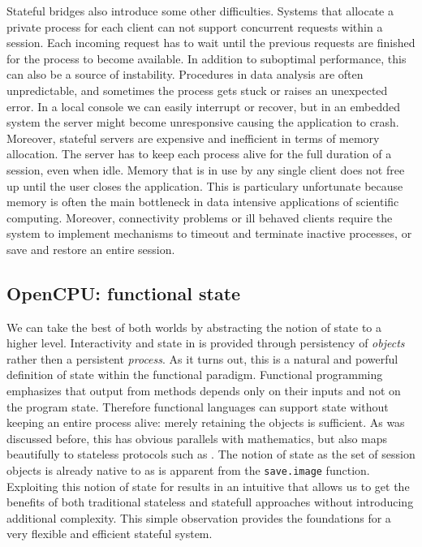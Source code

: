 Stateful bridges also introduce some other difficulties. Systems that allocate a private \R process for each client can not support concurrent requests within a session. Each incoming request has to wait until the previous requests are finished for the process to become available. In addition to suboptimal performance, this can also be a source of instability. Procedures in data analysis are often unpredictable, and sometimes the \R process gets stuck or raises an unexpected error. In a local console we can easily interrupt or recover, but in an embedded system the server might become unresponsive causing the application to crash. Moreover, stateful servers are expensive and inefficient in terms of memory allocation. The server has to keep each \R process alive for the full duration of a session, even when idle. Memory that is in use by any single client does not free up until the user closes the application. This is particulary unfortunate because memory is often the main bottleneck in data intensive applications of scientific computing. Moreover, connectivity problems or ill behaved clients require the system to implement mechanisms to timeout and terminate inactive processes, or save and restore an entire session.

\subsection{OpenCPU: functional state}

We can take the best of both worlds by abstracting the notion of state to a higher level. Interactivity and state in \OpenCPU is provided through persistency of \emph{objects} rather then a persistent \emph{process}. As it turns out, this is a natural and powerful definition of state within the functional paradigm. Functional programming emphasizes that output from methods depends only on their inputs and not on the program state. Therefore functional languages can support state without keeping an entire process alive: merely retaining the objects is sufficient. As was discussed before, this has obvious parallels with mathematics, but also maps beautifully to stateless protocols such as \HTTP. The notion of state as the set of session objects is already native to \R as is apparent from the \texttt{save.image} function. Exploiting this notion of state for \RPC results in an intuitive \API that allows us to get the benefits of both traditional stateless and statefull approaches without introducing additional complexity. This simple observation provides the foundations for a very flexible and efficient stateful \RPC system.

